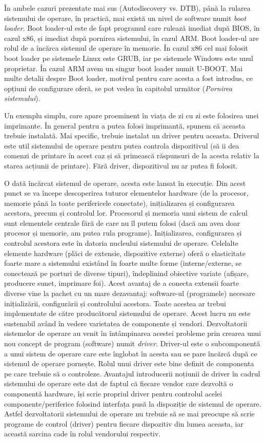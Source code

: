 În ambele cazuri prezentate mai sus (Autodiscovery vs. DTB), până la rularea
sistemului de operare, în practică, mai există un nivel de software numit
\textit{boot loader}. Boot loader-ul este de fapt programul care rulează imediat
după BIOS, în cazul x86, și imediat după pornirea sistemului, în cazul ARM. Boot
loader-ul are rolul de a încărca sistemul de operare în memorie. În cazul x86
cel mai folosit boot loader pe sistemele Linux este GRUB, iar pe sistemele
Windows este unul proprietar. În cazul ARM avem un singur boot loader numit
U-BOOT. Mai multe detalii despre Boot loader, motivul pentru care acesta a fost
introdus, ce opțiuni de configurare oferă, se pot vedea în capitolul următor
(\textit{Pornirea sistemului}).

Un exemplu simplu, care apare proeminent în viața de zi cu zi este folosirea
unei imprimante. În general pentru a putea folosi imprimantă, spunem că aceasta
trebuie instalată. Mai specific, trebuie instalat un driver pentru aceasta.
Driverul este util sistemului de operare pentru putea controla dispozitivul (să
ii dea comenzi de printare în acest caz și să primească răspunsuri de la acesta
relativ la starea acțiunii de printare). Fără driver, dispozitivul nu ar putea
fi folosit.

O dată încărcat sistemul de operare, acesta este lansat în execuție. Din acest
punct se va începe descoperirea tuturor elementelor hardware (de la procesor,
memorie până la toate perifericele conectate), inițializarea și configurarea
acestora, precum și controlul lor. Procesorul și memoria unui sistem de calcul
sunt elementele centrale fără de care nu îl putem folosi (dacă am avea doar
procesor și memorie, am putea rula programe). Inițializarea, configurarea și
controlul acestora este în datoria nucleului sistemului de operare. Celelalte
elemente hardware (plăci de extensie, dispozitive externe) oferă o elasticitate
foarte mare a sistemului existând în foarte multe forme (interne/externe, se
conectează pe porturi de diverse tipuri), îndeplinind obiective variate
(afișare, producere sunet, imprimare foi). Acest avantaj de a conecta extensii
foarte diverse vine la pachet cu un mare dezavantaj: software-ul (programele)
necesare inițializării, configurării și controlului acestora. Toate acestea ar
trebui implementate de către producătorul sistemului de operare. Acest lucru nu
este sustenabil având în vedere varietatea de componente și vendori.
Dezvoltatorii sistemelor de operare au venit în întâmpinarea acestei probleme
prin crearea unui nou concept de program (software) numit \textit{driver}.
Driver-ul este o subcomponentă a unui sistem de operare care este înglobat în
acesta sau se pare încărcă după ce sistemul de operare pornește. Rolul unui
driver este bine definit de componenta pe care trebuie să o controleze.
Avantajul introducerii noțiunii de driver în cadrul sistemului de operare este
dat de faptul că fiecare vendor care dezvoltă o componentă hardware, își scrie
propriul driver pentru controlul acelei componente/periferice folosind interfața
pusă la dispoziție de sistemul de operare. Astfel dezvoltatorii sistemului de
operare nu trebuie să se mai preocupe să scrie programe de control (driver)
pentru fiecare dispozitiv din lumea aceasta, iar această sarcina cade în rolul
vendorului respectiv.


